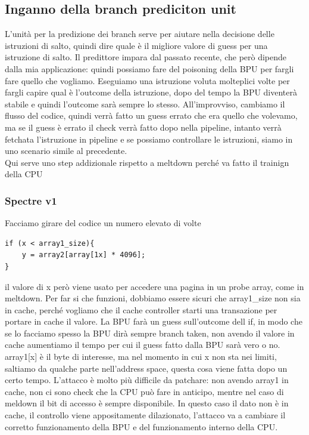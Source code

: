 \documentclass[12pt, oneside]{extbook} %
\begin{document}
\subsection{Inganno della branch prediciton unit}
L'unità per la predizione dei branch serve per aiutare nella decisione delle istruzioni di salto, quindi dire quale è il migliore valore di guess per una istruzione di salto. Il predittore impara dal passato recente, che però dipende dalla mia applicazione: quindi possiamo fare del poisoning della BPU per fargli fare quello che vogliamo. Eseguiamo una istruzione voluta molteplici volte per fargli capire qual è l'outcome della istruzione, dopo del tempo la BPU diventerà stabile e quindi l'outcome sarà sempre lo stesso. All'improvviso, cambiamo il flusso del codice, quindi verrà fatto un guess errato che era quello che volevamo, ma se il guess è errato il check verrà fatto dopo nella pipeline, intanto verrà fetchata l'istruzione in pipeline e se possiamo controllare le istruzioni, siamo in uno scenario simile al precedente.\\ Qui serve uno step addizionale rispetto a meltdown perché va fatto il trainign della CPU
\subsubsection{Spectre v1}
Facciamo girare del codice un numero elevato di volte
\begin{lstlisting}
if (x < array1_size){
	y = array2[array[1x] * 4096];
}
\end{lstlisting}
il valore di x però viene usato per accedere una pagina in un probe array, come in meltdown. Per far si che funzioni, dobbiamo essere sicuri che \textsf{array1\_size} non sia in cache, perché vogliamo che il cache controller starti una transazione per portare in cache il valore. La BPU farà un guess sull'outcome dell if, in modo che se lo facciamo spesso la BPU dirà sempre branch taken, non avendo il valore in cache aumentiamo il tempo per cui il guess fatto dalla BPU sarà vero o no. \textsf{array1[x]} è il byte di interesse, ma nel momento in cui x non sta nei limiti, saltiamo da qualche parte nell'address space, questa cosa viene fatta dopo un certo tempo.  L'attacco è molto più difficile da patchare: non avendo array1 in cache, non ci sono check che la CPU può fare in anticipo, mentre nel caso di meldown il bit di accesso è sempre disponibile. In questo caso il dato non è in cache, il controllo viene appositamente dilazionato, l'attacco va a cambiare il corretto funzionamento della BPU e del funzionamento interno della CPU.
\end{document}
